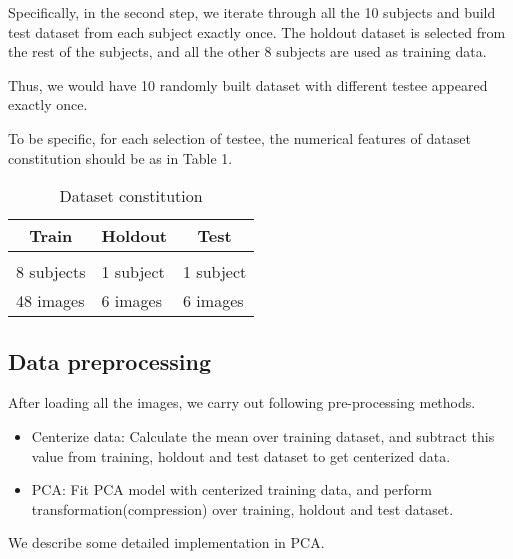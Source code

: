 \documentclass{article} %
\begin{document}
Specifically, in the second step, we iterate through all the 10 subjects and build test dataset from each subject exactly once.
The holdout dataset is selected from the rest of the subjects, and all the other 8 subjects are used as training data.

Thus, we would have 10 randomly built dataset with different testee appeared exactly once.

To be specific, for each selection of testee, the numerical features of dataset constitution should be as in Table 1.

\begin{table}[h]
    \caption{Dataset constitution}
    \label{evaluation-of-f}
    \begin{center}
    \begin{tabular}{lll}
    \multicolumn{1}{c}{\bf Train}  &\multicolumn{1}{c}{\bf Holdout} &\multicolumn{1}{c}{\bf Test}
    \\ \hline \\
    8 subjects & 1 subject & 1 subject \\
    48 images & 6 images & 6 images \\
    \end{tabular}
    \end{center}
    \end{table}

\subsection{Data preprocessing}
After loading all the images, we carry out following pre-processing methods.
\begin{itemize}
    \item Centerize data: Calculate the mean over training dataset, and subtract this value from training, holdout and test dataset to get centerized data.
    \item PCA: Fit PCA model with centerized training data, and perform transformation(compression) over training, holdout and test dataset.
\end{itemize}

We describe some detailed implementation in PCA.
\end{document}
